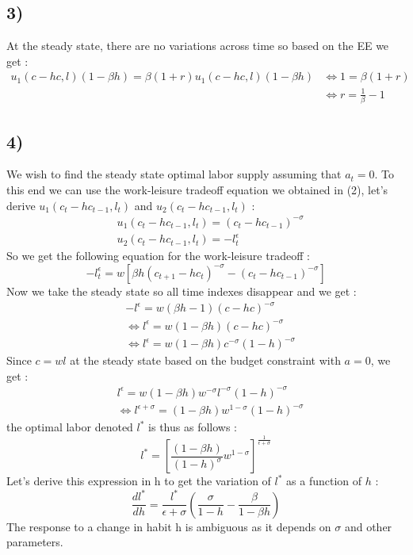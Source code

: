 \documentclass{article}
\begin{document}
\subsection{3)}
At the steady state, there are no variations across time so based on the EE we get : 
$$\begin{aligned}u_1(c-hc,l)(1-\beta h)=\beta(1+r)u_1(c-hc,l)(1-\beta h) &\Leftrightarrow 1  =\beta(1+r)\\
&\Leftrightarrow r =  \frac{1}{\beta}-1 
\end{aligned}
$$

\subsection{4)}
We wish to find the steady state optimal labor supply assuming that $a_t = 0$. To this end we can use the work-leisure tradeoff equation we obtained in (2), let's derive $u_1(c_t-hc_{t-1},l_t)$ and $u_2(c_t-hc_{t-1},l_t)$ : 
$$\begin{aligned}
    &u_1(c_t-hc_{t-1},l_t) = (c_t-hc_{t-1})^{-\sigma}\\
    &u_2(c_t-hc_{t-1},l_t) = -l_t^{\epsilon}
\end{aligned}$$
So we get the following equation for the work-leisure tradeoff : 
$$-l_t^{\epsilon} = w[\beta h (c_{t+1}-hc_t)^{-\sigma}-(c_t-hc_{t-1})^{-\sigma}]$$
Now we take the steady state so all time indexes disappear and we get :
$$\begin{aligned}
    &-l^\epsilon = w(\beta h-1)(c-hc)^{-\sigma}\\
    &\Leftrightarrow l^\epsilon = w(1-\beta h)(c-hc)^{-\sigma} \\
    &\Leftrightarrow l^\epsilon = w(1-\beta h)c^{-\sigma}(1-h)^{-\sigma}
\end{aligned}$$
Since $c=wl$ at the steady state based on the budget constraint with $a=0$, we get : 
$$\begin{aligned}
    &l^\epsilon = w(1-\beta h) w^{-\sigma}l^{-\sigma}(1-h)^{-\sigma}\\
    &\Leftrightarrow l^{\epsilon+\sigma} =(1-\beta h) w^{1-\sigma}(1-h)^{-\sigma}
\end{aligned}$$
the optimal labor denoted $l^*$ is thus as follows : 
$$l^* = [\frac{(1-\beta h)}{(1-h)^{\sigma}}w^{1-\sigma}]^{\frac{1}{\epsilon +\sigma }}$$
Let's derive this expression in h to get the variation of $l^*$ as a function of $h$ :  
$$\frac{dl^*}{dh}=\frac{l^*}{\epsilon+\sigma}(\frac{\sigma}{1-h}-\frac{\beta}{1-\beta h})$$
The response to a change in habit h is ambiguous as it depends on $\sigma$ and other parameters. 
\end{document}
